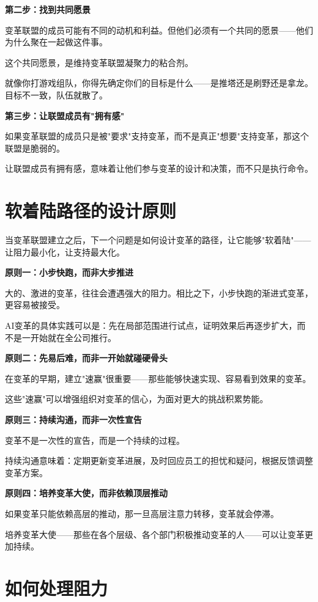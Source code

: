 \textbf{第二步：找到共同愿景}

变革联盟的成员可能有不同的动机和利益。但他们必须有一个共同的愿景——他们为什么聚在一起做这件事。

这个共同愿景，是维持变革联盟凝聚力的粘合剂。

就像你打游戏组队，你得先确定你们的目标是什么——是推塔还是刷野还是拿龙。目标不一致，队伍就散了。

\textbf{第三步：让联盟成员有"拥有感"}

如果变革联盟的成员只是被"要求"支持变革，而不是真正"想要"支持变革，那这个联盟是脆弱的。

让联盟成员有拥有感，意味着让他们参与变革的设计和决策，而不只是执行命令。

\section{软着陆路径的设计原则}


当变革联盟建立之后，下一个问题是如何设计变革的路径，让它能够"软着陆"——让阻力最小化，让支持最大化。

\textbf{原则一：小步快跑，而非大步推进}

大的、激进的变革，往往会遭遇强大的阻力。相比之下，小步快跑的渐进式变革，更容易被接受。

AI变革的具体实践可以是：先在局部范围进行试点，证明效果后再逐步扩大，而不是一开始就在全公司推行。

\textbf{原则二：先易后难，而非一开始就碰硬骨头}

在变革的早期，建立"速赢"很重要——那些能够快速实现、容易看到效果的变革。

这些"速赢"可以增强组织对变革的信心，为面对更大的挑战积累势能。

\textbf{原则三：持续沟通，而非一次性宣告}

变革不是一次性的宣告，而是一个持续的过程。

持续沟通意味着：定期更新变革进展，及时回应员工的担忧和疑问，根据反馈调整变革方案。

\textbf{原则四：培养变革大使，而非依赖顶层推动}

如果变革只能依赖高层的推动，那一旦高层注意力转移，变革就会停滞。

培养变革大使——那些在各个层级、各个部门积极推动变革的人——可以让变革更加持续。

\section{如何处理阻力}


